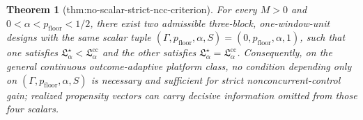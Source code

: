 \documentclass{article}
\newtheorem{theorem}{Theorem}
\begin{document}
\begin{theorem}[thm:no-scalar-strict-ncc-criterion]\label{thm:no-scalar-strict-ncc-criterion}
For every \(M>0\) and \(0<\alpha<p_{\mathrm{floor}}<1/2\), there exist two admissible three-block, one-window-unit designs with the same scalar tuple \((\Gamma,p_{\mathrm{floor}},\alpha,S)=(0,p_{\mathrm{floor}},\alpha,1)\), such that one satisfies \(\mathfrak L_\alpha^\star<\mathfrak L_\alpha^{\mathrm{cc}}\) and the other satisfies \(\mathfrak L_\alpha^\star=\mathfrak L_\alpha^{\mathrm{cc}}\).  Consequently, on the general continuous outcome-adaptive platform class, no condition depending only on \((\Gamma,p_{\mathrm{floor}},\alpha,S)\) is necessary and sufficient for strict nonconcurrent-control gain; realized propensity vectors can carry decisive information omitted from those four scalars.
\end{theorem}
\end{document}
